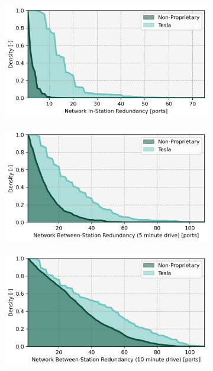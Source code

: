\documentclass[11pt]{article}
\begin{document}
\begin{multicols}{2}
\begin{figure}[H]
	\centering
	\begin{subfigure}{\linewidth}
		\includegraphics[width = \linewidth]{figs/California_RIS_Hist.png}
	\end{subfigure}
	\begin{subfigure}{\linewidth}
		\includegraphics[width = \linewidth]{figs/California_RBS_Hist_300.png}
	\end{subfigure}
	\begin{subfigure}{\linewidth}
		\includegraphics[width = \linewidth]{figs/California_RBS_Hist_600.png}

\end{subfigure}
\end{figure}
\end{multicols}
\end{document}
